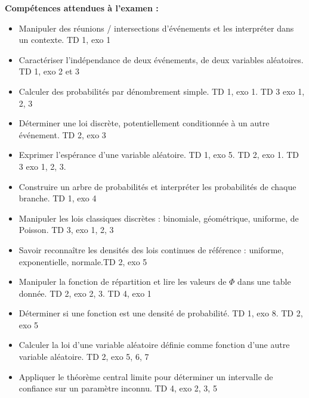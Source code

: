 \textbf{Compétences attendues à l'examen :}
\begin{itemize}
    \item[$\bullet$] Manipuler des réunions / intersections d'événements et les interpréter dans un contexte. \dotfill TD 1, exo 1
    \vspace{0.5em}
    \item[$\bullet$] Caractériser l'indépendance de deux événements, de deux variables aléatoires. \dotfill TD 1, exo 2 et 3
    \vspace{0.5em}
    \item[$\bullet$] Calculer des probabilités par dénombrement simple. \dotfill TD 1, exo 1. TD 3 exo 1, 2, 3
    \vspace{0.5em}
    \item[$\bullet$] Déterminer une loi discrète, potentiellement conditionnée à un autre événement. \dotfill TD 2, exo 3
    \vspace{0.5em}
    \item[$\bullet$] Exprimer l'espérance d'une variable aléatoire. \dotfill TD 1, exo 5. TD 2, exo 1. TD 3 exo 1, 2, 3. 
    \vspace{0.5em}
    \item[$\bullet$] Construire un arbre de probabilités et interpréter les probabilités de chaque branche. \dotfill TD 1, exo 4
    \vspace{0.5em}
    \item[$\bullet$] Manipuler les lois classiques discrètes : binomiale, géométrique, uniforme, de Poisson. \dotfill TD 3, exo 1, 2, 3
    \vspace{0.5em}
    \item[$\bullet$] Savoir reconnaître les densités des lois continues de référence : uniforme, exponentielle, normale.\dotfill TD 2, exo 5
    \vspace{0.5em}
    \item[$\bullet$] Manipuler la fonction de répartition et lire les valeurs de $\Phi$ dans une table donnée. \dotfill TD 2, exo 2, 3. TD 4, exo 1
    \vspace{0.5em}
    \item[$\bullet$] Déterminer si une fonction est une densité de probabilité. \dotfill TD 1, exo 8. TD 2, exo 5
    \vspace{0.5em}
    \item[$\bullet$] Calculer la loi d'une variable aléatoire définie comme fonction d'une autre variable aléatoire. \dotfill TD 2, exo 5, 6, 7
    \vspace{0.5em}
    \item[$\bullet$] Appliquer le théorème central limite pour déterminer un intervalle de confiance sur un paramètre inconnu. \dotfill TD 4, exo 2, 3, 5
\end{itemize}

